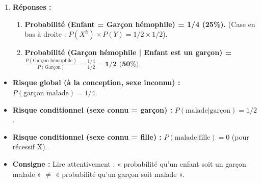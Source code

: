 \documentclass[11pt]{article}
\begin{document}
\begin{exoresolu}
\begin{enumerate}
              \[
              \begin{array}{c|cc}
              \text{Mère} \backslash \text{Père} & X^H (1/2) & Y (1/2) \\ \hline
              X^H (1/2) & X^H X^H \text{ (Fille saine) } 1/4 & X^H Y \text{ (Garçon sain) } 1/4 \\
              X^h (1/2) & X^H X^h \text{ (Fille porteuse) } 1/4 & X^h Y \text{ (Garçon hémophile) } 1/4 \\
              \end{array}
              \]
        \item \textbf{Réponses :}
              \begin{enumerate}
                  \item \textbf{Probabilité (Enfant = Garçon hémophile) = 1/4 (25\%).} (Case en bas à droite : $P(X^h) \times P(Y) = 1/2 \times 1/2$).
                  \item \textbf{Probabilité (Garçon hémophile | Enfant est un garçon) = } $\frac{P(\text{Garçon hémophile})}{P(\text{Garçon})} = \frac{1/4}{1/2} = \textbf{1/2 (50\%)}$.
              \end{enumerate}
    \end{enumerate}
    \begin{aretenir}
        \begin{itemize}
            \item \textbf{Risque global (à la conception, sexe inconnu) :} $P(\text{garçon malade}) = 1/4$.
            \item \textbf{Risque conditionnel (sexe connu = garçon) :} $P(\text{malade} | \text{garçon}) = 1/2$.
            \item \textbf{Risque conditionnel (sexe connu = fille) :} $P(\text{malade} | \text{fille}) = 0$ (pour récessif X).
            \item \textbf{Consigne :} Lire attentivement : « probabilité qu'un enfant soit un garçon malade » $\neq$ « probabilité qu'un garçon soit malade ».
        \end{itemize}
    \end{aretenir}
\end{exoresolu}
\end{document}
